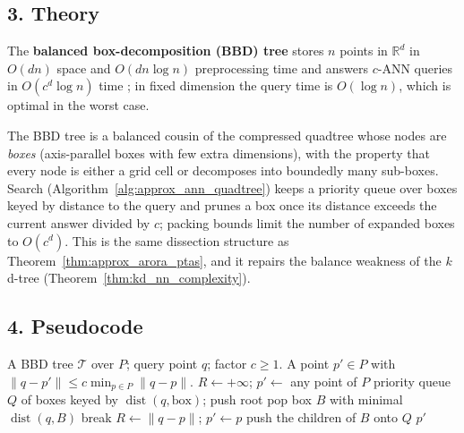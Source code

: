 \subsection{3. Theory}

\begin{theorem}\label{thm:approx_ann_complexity}
  The \textbf{balanced box-decomposition (BBD) tree} stores $n$ points in
  $\mathbb{R}^d$ in $O(dn)$ space and $O(dn \log n)$ preprocessing time and
  answers $c$-ANN queries in $O(c^d \log n)$ time \cite{arya1998}; in fixed
  dimension the query time is $O(\log n)$, which is optimal in the worst
  case.
\end{theorem}

The BBD tree is a balanced cousin of the compressed quadtree whose nodes are
\emph{boxes} (axis-parallel boxes with few extra dimensions), with the
property that every node is either a grid cell or decomposes into boundedly
many sub-boxes. Search (Algorithm~\ref{alg:approx_ann_quadtree}) keeps a
priority queue over boxes keyed by distance to the query and prunes a box
once its distance exceeds the current answer divided by $c$; packing bounds
limit the number of expanded boxes to $O(c^d)$. This is the same dissection
structure as Theorem~\ref{thm:approx_arora_ptas}, and it repairs the balance
weakness of the $k$d-tree (Theorem~\ref{thm:kd_nn_complexity}).

\subsection{4. Pseudocode}

\begin{algorithm}[htbp]
\caption{$c$-Approximate Nearest Neighbor via Box Decomposition}
\label{alg:approx_ann_quadtree}
\begin{algorithmic}[1]
\Require A BBD tree $\mathcal{T}$ over $P$; query point $q$; factor $c \geq 1$.
\Ensure A point $p' \in P$ with $\|q - p'\| \leq c \min_{p \in P}\|q - p\|$.
  \State $R \gets +\infty$; $p' \gets$ any point of $P$
  \State priority queue $Q$ of boxes keyed by $\operatorname{dist}(q, \text{box})$; push root
    \State pop box $B$ with minimal $\operatorname{dist}(q, B)$
     \State break \EndIf {}
        $R \gets \|q - p\|$; $p' \gets p$ \EndIf \EndFor
    \Else \State push the children of $B$ onto $Q$ \EndIf
  \EndWhile
  \State \Return $p'$
\EndFunction
\end{algorithmic}
\end{algorithm}

